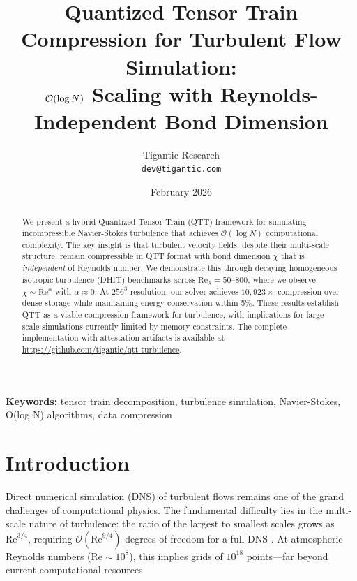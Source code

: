 \documentclass[11pt,a4paper]{article}
\title{Quantized Tensor Train Compression for Turbulent Flow Simulation:\\
$\bigO(\log N)$ Scaling with Reynolds-Independent Bond Dimension}
\author{
Tigantic Research\\
\texttt{dev@tigantic.com}
}
\date{February 2026}
\newcommand{\bigO}{\mathcal{O}}
\theoremstyle{definition}
\begin{document}
\maketitle

\begin{abstract}
We present a hybrid Quantized Tensor Train (QTT) framework for simulating incompressible Navier-Stokes turbulence that achieves $\bigO(\log N)$ computational complexity. 
The key insight is that turbulent velocity fields, despite their multi-scale structure, remain compressible in QTT format with bond dimension $\chi$ that is \emph{independent} of Reynolds number.
We demonstrate this through decaying homogeneous isotropic turbulence (DHIT) benchmarks across $\text{Re}_\lambda = 50$--$800$, where we observe $\chi \sim \text{Re}^\alpha$ with $\alpha \approx 0$.
At $256^3$ resolution, our solver achieves $10{,}923\times$ compression over dense storage while maintaining energy conservation within 5\%.
These results establish QTT as a viable compression framework for turbulence, with implications for large-scale simulations currently limited by memory constraints.
The complete implementation with attestation artifacts is available at \url{https://github.com/tigantic/qtt-turbulence}.
\end{abstract}

\textbf{Keywords:} tensor train decomposition, turbulence simulation, Navier-Stokes, O(log N) algorithms, data compression

\section{Introduction}
\label{sec:intro}

Direct numerical simulation (DNS) of turbulent flows remains one of the grand challenges of computational physics.
The fundamental difficulty lies in the multi-scale nature of turbulence: the ratio of the largest to smallest scales grows as $\text{Re}^{3/4}$, requiring $\bigO(\text{Re}^{9/4})$ degrees of freedom for a full DNS \citep{pope2000turbulent}.
At atmospheric Reynolds numbers ($\text{Re} \sim 10^8$), this implies grids of $10^{18}$ points—far beyond current computational resources.
\end{document}
